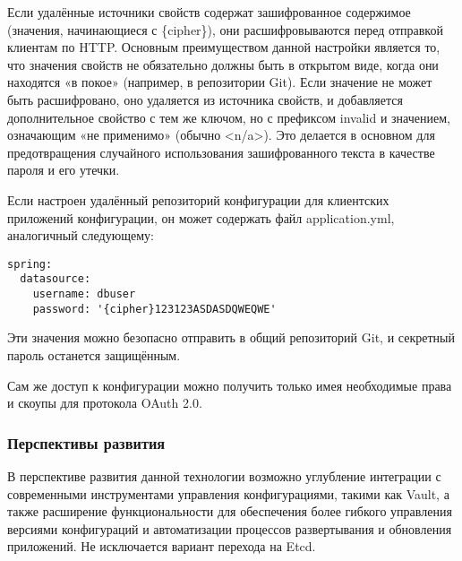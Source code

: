 Если удалённые источники свойств содержат зашифрованное содержимое (значения, начинающиеся с \{cipher\}), они расшифровываются перед отправкой клиентам по HTTP. Основным преимуществом данной настройки является то, что значения свойств не обязательно должны быть в открытом виде, когда они находятся «в покое» (например, в репозитории Git).
Если значение не может быть расшифровано, оно удаляется из источника свойств, и добавляется дополнительное свойство с тем же ключом, но с префиксом invalid и значением, означающим «не применимо» (обычно <n/a>).
Это делается в основном для предотвращения случайного использования зашифрованного текста в качестве пароля и его утечки.

Если настроен удалённый репозиторий конфигурации для клиентских приложений конфигурации, он может содержать файл application.yml, аналогичный следующему:

\begin{verbatim}
spring:
  datasource:
    username: dbuser
    password: '{cipher}123123ASDASDQWEQWE'
\end{verbatim}

Эти значения можно безопасно отправить в общий репозиторий Git, и секретный пароль останется защищённым.

Сам же доступ к конфигурации можно получить только имея необходимые права и скоупы для протокола OAuth 2.0.

\subsubsection{Перспективы развития}

В перспективе развития данной технологии возможно углубление интеграции с современными инструментами управления
конфигурациями, такими как Vault, а также расширение функциональности для
обеспечения более гибкого управления версиями конфигураций и автоматизации процессов развертывания и обновления
приложений.
Не исключается вариант перехода на Etcd.
